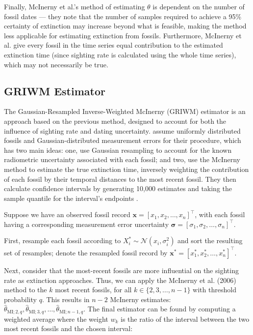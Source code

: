 Finally, McInerny et al.'s method of estimating $\theta$ is dependent on the number of fossil dates --- they note that the number of samples required to achieve a 95\% certainty of extinction may increase beyond what is feasible, making the method less applicable for estimating extinction from fossils. Furthermore, McInerny et al. give every fossil in the time series equal contribution to the estimated extinction time (since sighting rate is calculated using the whole time series), which may not necessarily be true.

\subsection{GRIWM Estimator}

The Gaussian-Resampled Inverse-Weighted McInerny (GRIWM) estimator is an approach based on the previous \textcite{Mcinerny2006} method, designed to account for both the influence of sighting rate and dating uncertainty. \textcite{Bradshaw2012} assume uniformly distributed fossils and Gaussian-distributed measurement errors for their procedure, which has two main ideas: one, use Gaussian resampling to account for the known radiometric uncertainty associated with each fossil; and two, use the McInerny method to estimate the true extinction time, inversely weighting the contribution of each fossil by their temporal distances to the most recent fossil. They then calculate confidence intervals by generating 10,000 estimates and taking the sample quantile for the interval's endpoints \parencite{Bradshaw2012}.

Suppose we have an observed fossil record $\bm{x} = [x_1, x_2, \dots, x_n]^\top$, with each fossil having a corresponding measurement error uncertainty $\bm{\sigma}=[\sigma_1, \sigma_2, \dots, \sigma_n]^\top$.

First, resample each fossil according to $X^*_i \sim \mathcal{N}(x_i, \sigma_i^2)$ and sort the resulting set of resamples; denote the resampled fossil record by $\bm{x^*} = [x^*_1, x^*_2, \dots, x^*_n]^\top$.

Next, consider that the most-recent fossils are more influential on the sighting rate as extinction approaches. Thus, we can apply the McInerny et al. (2006) method to the $k$ most recent fossils, for all $k \in \{2, 3, \dots, n-1\}$ with threshold probability $q$. This results in $n-2$ McInerny estimates: $\hat\theta_{\text{MI}; 2, q}, \hat\theta_{\text{MI}; 3, q}, \dots, \hat\theta_{\text{MI}; n-1, q}$. The final estimator can be found by computing a weighted average where the weight $w_k$ is the ratio of the interval between the two most recent fossils and the chosen interval:

